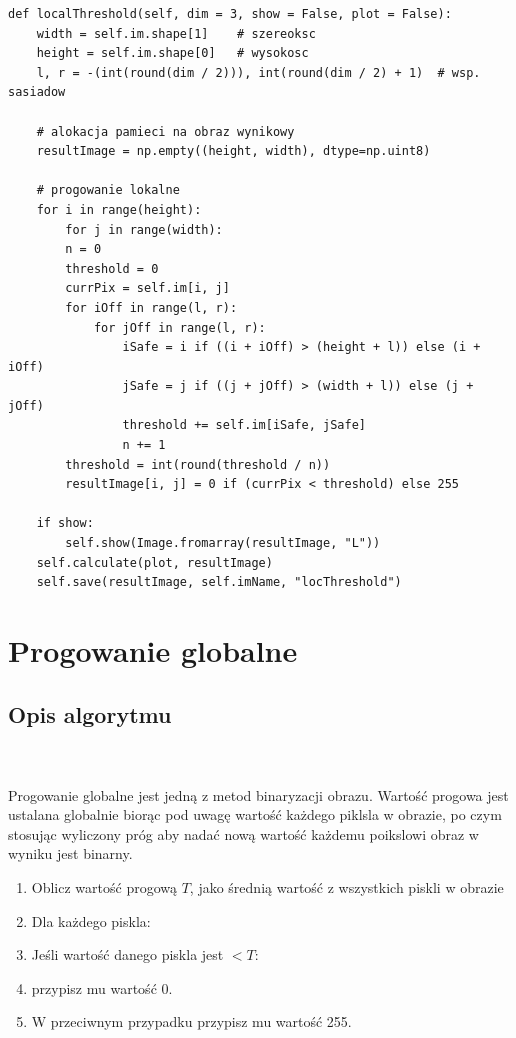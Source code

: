 \documentclass[final,a4paper,openany,12pt]{mwbk}
\begin{document}

\begin{lstlisting}[caption=Progowanie lokalne]
def localThreshold(self, dim = 3, show = False, plot = False):
	width = self.im.shape[1]    # szereoksc
	height = self.im.shape[0]   # wysokosc
	l, r = -(int(round(dim / 2))), int(round(dim / 2) + 1)  # wsp. sasiadow
	
	# alokacja pamieci na obraz wynikowy
	resultImage = np.empty((height, width), dtype=np.uint8)
	
	# progowanie lokalne
	for i in range(height):
		for j in range(width):
		n = 0
		threshold = 0
		currPix = self.im[i, j]
		for iOff in range(l, r):
			for jOff in range(l, r):
				iSafe = i if ((i + iOff) > (height + l)) else (i + iOff)
				jSafe = j if ((j + jOff) > (width + l)) else (j + jOff)
				threshold += self.im[iSafe, jSafe]
				n += 1
		threshold = int(round(threshold / n))
		resultImage[i, j] = 0 if (currPix < threshold) else 255
	
	if show:
		self.show(Image.fromarray(resultImage, "L"))
	self.calculate(plot, resultImage)
	self.save(resultImage, self.imName, "locThreshold")
\end{lstlisting}

\newpage
\clearpage




\section{Progowanie globalne}
\subsection*{Opis algorytmu}
\hfill
\\\\
\indent Progowanie globalne jest jedną z metod binaryzacji obrazu. Wartość progowa jest ustalana globalnie biorąc pod uwagę wartość każdego piklsla w obrazie, po czym stosując wyliczony próg aby nadać nową wartość każdemu poikslowi obraz w wyniku jest binarny.
\begin{enumerate}
	\item Oblicz wartość progową $T$, jako średnią wartość z wszystkich piskli w obrazie
	\item Dla każdego piskla:
	\item Jeśli wartość danego piskla jest $< T$:
	\item przypisz mu wartość $0$.
	\item W przeciwnym przypadku przypisz mu wartość 255.
\end{enumerate}
\end{document}

